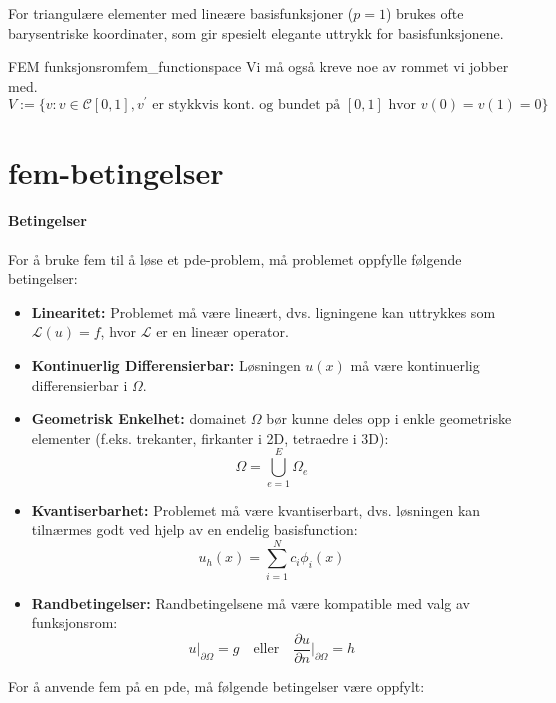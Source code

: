\documentclass[../main.tex]{subfiles}
\begin{document}
For triangulære elementer med lineære basisfunksjoner ($p=1$) brukes ofte barysentriske koordinater, som gir spesielt elegante uttrykk for basisfunksjonene.

\begin{remark}{FEM funksjonsrom}{fem_functionspace}
    Vi må også kreve noe av rommet vi jobber med.
    \[
        V := \{v : v \in \mathcal{C}[0, 1], v^\prime \text{ er stykkvis kont. og bundet på } [0, 1] \text{ hvor } v(0)=v(1)= 0\}
    \]
\end{remark}

\section{fem-betingelser}

\paragraph{Betingelser}

For å bruke fem til å løse et pde-problem, må problemet oppfylle følgende betingelser:

\begin{itemize}
    \item \textbf{Linearitet:} Problemet må være lineært, dvs. ligningene kan uttrykkes som \(\mathcal{L}(u) = f\), hvor \(\mathcal{L}\) er en lineær operator.
    \item \textbf{Kontinuerlig Differensierbar:} Løsningen \( u(x) \) må være kontinuerlig differensierbar i \( \Omega \).
    \item \textbf{Geometrisk Enkelhet:} domainet \( \Omega \) bør kunne deles opp i enkle geometriske elementer (f.eks. trekanter, firkanter i 2D, tetraedre i 3D):
          \[
              \Omega = \bigcup_{e=1}^{E} \Omega_e
          \]
    \item \textbf{Kvantiserbarhet:} Problemet må være kvantiserbart, dvs. løsningen kan tilnærmes godt ved hjelp av en endelig basisfunction:
          \[
              u_h(x) = \sum_{i=1}^{N} c_i \phi_i(x)
          \]
    \item \textbf{Randbetingelser:} Randbetingelsene må være kompatible med valg av funksjonsrom:
          \[
              u|_{\partial \Omega} = g \quad \text{eller} \quad \frac{\partial u}{\partial n}\bigg|_{\partial \Omega} = h
          \]
\end{itemize}

For å anvende fem på en pde, må følgende betingelser være oppfylt:
\end{document}
